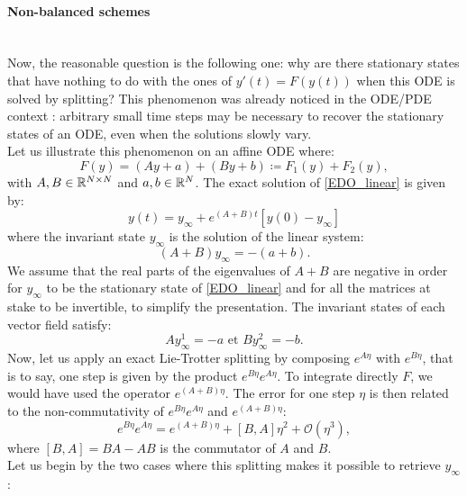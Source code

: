 \paragraph{Non-balanced schemes}
~~\\
Now, the reasonable question is the following one: why are there stationary states that have nothing to do with the ones of $y'(t)=F(y(t))$ when this ODE is solved by splitting? This phenomenon was already noticed in the ODE/PDE context \cite{rebalanced_splitting}: arbitrary small time steps may be necessary to recover the stationary states of an ODE, even when the solutions slowly vary. \\
Let us illustrate this phenomenon on an affine ODE where:
\begin{equation}
	F(y) = \left(Ay+a\right) + \left(By+b\right) \coloneqq F_1(y) + F_2(y),
	\label{EDO_linear}
\end{equation}
with $A,B \in \mathbb{R}^{N \times N}$ and $a,b \in \mathbb{R}^N$. The exact solution of \eqref{EDO_linear} is given by:
\begin{equation*}
	y(t) = y_{\infty} + e^{(A+B)t}\left[y(0)-y_{\infty}\right]
\end{equation*}
where the invariant state $y_{\infty}$ is the solution of the linear system:
\begin{equation*}
	(A+B)y_{\infty} = -(a+b).
\end{equation*}
We assume that the real parts of the eigenvalues of $A+B$ are negative in order for $y_{\infty}$ to be the stationary state of \eqref{EDO_linear} and for all the matrices at stake to be invertible, to simplify the presentation. The invariant states of each vector field satisfy:
\begin{equation*}
	Ay_{\infty}^1 = -a \text{ et } By_{\infty}^2 = -b.
\end{equation*}
Now, let us apply an exact Lie-Trotter splitting by composing $e^{A\eta}$ with $e^{B\eta}$, that is to say, one step is given by the product $e^{B\eta}e^{A\eta}$. To integrate
directly $F$, we would have used the operator $e^{(A+B)\eta}$. The error for one step $\eta$ is then related to the non-commutativity of $e^{B\eta}e^{A\eta}$ and $e^{(A+B)\eta}$:
\begin{equation}
	e^{B\eta}e^{A\eta} = e^{(A+B)\eta} + \left[B,A\right]\eta^2 + \mathcal{O}(\eta^3),
	\label{Taylor_split}
\end{equation}
where $\left[B,A\right]=BA-AB$ is the commutator of $A$ and $B$.\\
Let us begin by the two cases where this splitting makes it possible to retrieve $y_{\infty}$:
